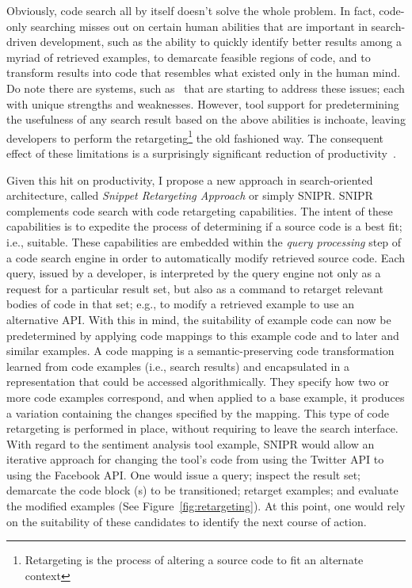 Obviously, code search all by itself doesn't solve the whole problem. In fact, code-only searching misses out on certain human abilities that are important in search-driven development, such as the ability to quickly identify better results among a myriad of retrieved examples, to demarcate feasible regions of code, and to transform results into code that resembles what existed only in the human mind. Do note there are systems, such as~\cite{Bajracharya:2010um, Gysin:2010kt, Hartmann:2010hx, McMillan:2012dj, Sawadsky:2011eh, Wightman:2012gc} that are starting to address these issues; each with unique strengths and weaknesses. However, tool support for predetermining the usefulness of any search result based on the above abilities is inchoate, leaving developers to perform the retargeting\footnote{Retargeting is the process of altering a source code to fit an alternate context} the old fashioned way. The consequent effect of these limitations is a surprisingly significant reduction of productivity~\cite{Cypher:2010ub, Gysin:2010kt}.

Given this hit on productivity, I propose a new approach in search-oriented architecture, called \emph{Snippet Retargeting Approach} or simply \uppercase{SnipR}. \uppercase{SnipR} complements code search with code retargeting capabilities. The intent of these capabilities is to expedite the process of determining if a source code is a best fit; i.e., suitable. These capabilities are embedded within the \emph{query processing} step of a code search engine in order to automatically modify retrieved source code. Each query, issued by a developer, is interpreted by the query engine not only as a request for a particular result set, but also as a command to retarget relevant bodies of code in that set; e.g., to modify a retrieved example to use an alternative API. With this in mind, the suitability of example code can now be predetermined by applying code mappings to this example code and to later and similar examples. A code mapping is a semantic-preserving code transformation learned from code examples (i.e., search results) and encapsulated in a representation that could be accessed algorithmically. They specify how two or more code examples correspond, and when applied to a base example, it produces a variation containing the changes specified by the mapping. This type of code retargeting is performed in place, without requiring to leave the search interface. With regard to the sentiment analysis tool example, \uppercase{SnipR} would allow an iterative approach for changing the tool's code from using the Twitter API to using the Facebook API. One would issue a query; inspect the result set; demarcate the code block (s) to be transitioned; retarget examples; and evaluate the modified examples (See Figure~\ref{fig:retargeting}). At this point, one would rely on the suitability of these candidates to identify the next course of action.

